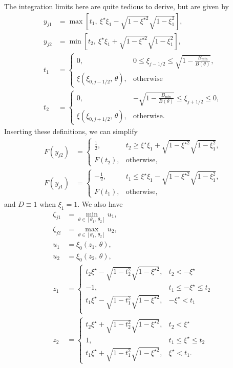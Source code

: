 \documentclass[11pt,a4paper]{article}
\newcommand{\sub}[1]{\ensuremath{_{\text{#1}}}}
\begin{document}
The integration limits here are quite tedious to derive, but are given by
\begin{align}
y_{j1} &= \max\left[t_1,~\xi^\star \xi_1 - \sqrt{1-\xi^{\star 2}}\sqrt{1-\xi_1^2}\right] ,\nonumber \\
y_{j2} &= \min\left[t_2,~\xi^\star \xi_1 + \sqrt{1-\xi^{\star 2}}\sqrt{1-\xi_1^2}\right], \nonumber \\
t_1 &= \begin{cases}
0, & 0 \leq \xi_{j-1/2} \leq \sqrt{1-\frac{B\sub{min}}{B(\theta)}}, \\
\xi(\xi_{0, j-1/2},\,\theta),& \mathrm{otherwise}
\end{cases} \nonumber \\
t_2 &= \begin{cases}
0, & -\sqrt{1-\frac{B\sub{min}}{B(\theta)}} \leq \xi_{j+1/2} \leq 0, \\
\xi(\xi_{0, j+1/2},\,\theta),& \mathrm{otherwise}.
\end{cases} \nonumber
\end{align}
Inserting these definitions, we can simplify
\begin{align}
F(y_{j2})  &= \begin{cases}
\frac{1}{2}, & t_2 \geq \xi^\star \xi_1 + \sqrt{1-\xi^{\star 2}}\sqrt{1-\xi_1^2}, \\
F(t_2), & \mathrm{otherwise},
\end{cases} \nonumber\\
F(y_{j1}) &= \begin{cases}
-\frac{1}{2}, & t_1 \leq \xi^\star \xi_1 - \sqrt{1-\xi^{\star 2}}\sqrt{1-\xi_1^2}, \\
F(t_1), & \mathrm{otherwise},
\end{cases} \nonumber
\end{align}
and $D\equiv 1$ when $\xi_1=1$. We also have
\begin{align}
\zeta_{j1} &= \min_{\theta\in[\theta_1,\,\theta_2]} u_1, \nonumber \\
\zeta_{j2} &= \max_{\theta\in[\theta_1,\,\theta_2]}u_2, \nonumber  \\
u_1 &= \xi_0(z_1,\,\theta), \nonumber \\
u_2 &= \xi_0(z_2,\,\theta), \nonumber \\
z_1 &= \begin{cases}
t_2 \xi^\star - \sqrt{1-t_2^2} \sqrt{1-\xi^{\star 2}}, & t_2 < -\xi^\star \\
-1, & t_1 \leq -\xi^\star \leq t_2\\
t_1 \xi^\star - \sqrt{1-t_1^2} \sqrt{1-\xi^{\star 2}}, & -\xi^\star < t_1 \\
\end{cases} \nonumber \\
z_2 &= \begin{cases}
t_2 \xi^\star + \sqrt{1-t_2^2} \sqrt{1-\xi^{\star 2}}, & t_2 < \xi^\star \\
1, & t_1 \leq \xi^\star \leq t_2\\
t_1 \xi^\star + \sqrt{1-t_1^2} \sqrt{1-\xi^{\star 2}}, & \xi^\star < t_1 .
\end{cases} 
\end{align}
\end{document}

